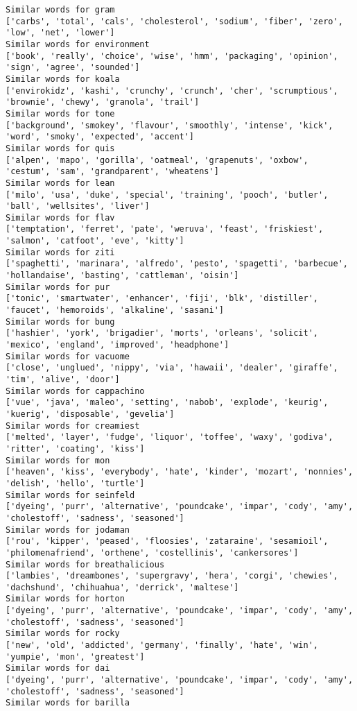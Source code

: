 \documentclass[11pt]{article}
\begin{document}
\begin{Verbatim}[commandchars=\\\{\}]
Similar words for gram
['carbs', 'total', 'cals', 'cholesterol', 'sodium', 'fiber', 'zero', 'low', 'net', 'lower']
Similar words for environment
['book', 'really', 'choice', 'wise', 'hmm', 'packaging', 'opinion', 'sign', 'agree', 'sounded']
Similar words for koala
['envirokidz', 'kashi', 'crunchy', 'crunch', 'cher', 'scrumptious', 'brownie', 'chewy', 'granola', 'trail']
Similar words for tone
['background', 'smokey', 'flavour', 'smoothly', 'intense', 'kick', 'word', 'smoky', 'expected', 'accent']
Similar words for quis
['alpen', 'mapo', 'gorilla', 'oatmeal', 'grapenuts', 'oxbow', 'cestum', 'sam', 'grandparent', 'wheatens']
Similar words for lean
['milo', 'usa', 'duke', 'special', 'training', 'pooch', 'butler', 'ball', 'wellsites', 'liver']
Similar words for flav
['temptation', 'ferret', 'pate', 'weruva', 'feast', 'friskiest', 'salmon', 'catfoot', 'eve', 'kitty']
Similar words for ziti
['spaghetti', 'marinara', 'alfredo', 'pesto', 'spagetti', 'barbecue', 'hollandaise', 'basting', 'cattleman', 'oisin']
Similar words for pur
['tonic', 'smartwater', 'enhancer', 'fiji', 'blk', 'distiller', 'faucet', 'hemoroids', 'alkaline', 'sasani']
Similar words for bung
['hashier', 'york', 'brigadier', 'morts', 'orleans', 'solicit', 'mexico', 'england', 'improved', 'headphone']
Similar words for vacuome
['close', 'unglued', 'nippy', 'via', 'hawaii', 'dealer', 'giraffe', 'tim', 'alive', 'door']
Similar words for cappachino
['vue', 'java', 'maleo', 'setting', 'nabob', 'explode', 'keurig', 'kuerig', 'disposable', 'gevelia']
Similar words for creamiest
['melted', 'layer', 'fudge', 'liquor', 'toffee', 'waxy', 'godiva', 'ritter', 'coating', 'kiss']
Similar words for mon
['heaven', 'kiss', 'everybody', 'hate', 'kinder', 'mozart', 'nonnies', 'delish', 'hello', 'turtle']
Similar words for seinfeld
['dyeing', 'purr', 'alternative', 'poundcake', 'impar', 'cody', 'amy', 'cholestoff', 'sadness', 'seasoned']
Similar words for jodaman
['rou', 'kipper', 'peased', 'floosies', 'zataraine', 'sesamioil', 'philomenafriend', 'orthene', 'costellinis', 'cankersores']
Similar words for breathalicious
['lambies', 'dreambones', 'supergravy', 'hera', 'corgi', 'chewies', 'dachshund', 'chihuahua', 'derrick', 'maltese']
Similar words for horton
['dyeing', 'purr', 'alternative', 'poundcake', 'impar', 'cody', 'amy', 'cholestoff', 'sadness', 'seasoned']
Similar words for rocky
['new', 'old', 'addicted', 'germany', 'finally', 'hate', 'win', 'yumpie', 'mon', 'greatest']
Similar words for dai
['dyeing', 'purr', 'alternative', 'poundcake', 'impar', 'cody', 'amy', 'cholestoff', 'sadness', 'seasoned']
Similar words for barilla

\end{Verbatim}
\end{document}
